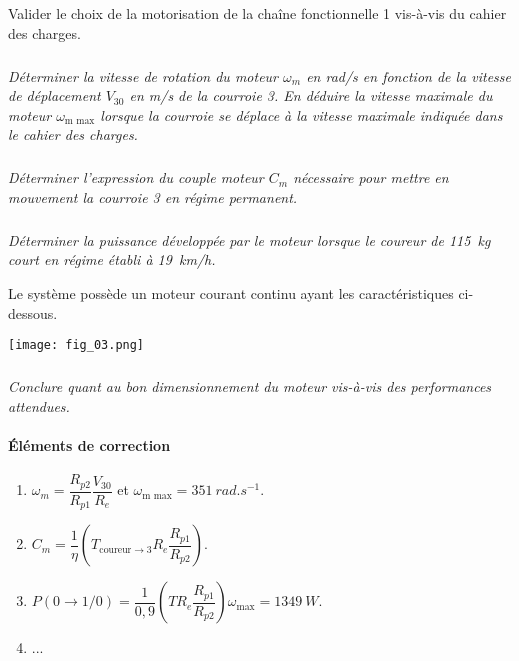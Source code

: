 \begin{multicols}{2}
\begin{obj}
Valider le choix de la motorisation de la chaîne fonctionnelle 1 vis-à-vis du cahier des charges.
\end{obj}


\subparagraph{}
\textit{Déterminer la vitesse de rotation du moteur $\omega_m$ en rad/s en fonction de la vitesse de déplacement
$V_{30}$ en m/s de la courroie 3. En déduire la vitesse maximale du moteur $\omega_{\text{m max}}$ lorsque la courroie se
déplace à la vitesse maximale indiquée dans le cahier des charges.}
\ifprof
\begin{corrige}
\end{corrige}\else\fi


\subparagraph{}
\textit{Déterminer l’expression du couple moteur $C_m$ nécessaire pour mettre en mouvement la courroie 3 en
régime permanent.}
\ifprof
\begin{corrige}
\end{corrige}\else\fi


\subparagraph{}
\textit{Déterminer la puissance développée par le moteur lorsque le coureur de \SI{115}{kg} court en régime
établi à \SI{19}{km/h}.}
\ifprof
\begin{corrige}
\end{corrige}\else\fi
Le système possède
un moteur courant
continu ayant les
caractéristiques ci-dessous.

\begin{center}
\texttt{[image: fig\_03.png]}
\end{center}

\subparagraph{}
\textit{Conclure quant au bon dimensionnement du moteur vis-à-vis des performances attendues.}
\ifprof
\begin{corrige}
\end{corrige}\else\fi

\ifcolle
\else
\vspace{1cm}
\footnotesize
\paragraph*{Éléments de correction}
\begin{enumerate}
\item $\omega_m=\dfrac{R_{p2}}{R_{p1}}\dfrac{V_{30}}{R_e}$ et $\omega_{\text{m max}}=\SI{351}{rad.s^{-1}}$.
\item $C_m=\dfrac{1}{\eta}\left( T_{\text{coureur}\rightarrow 3} R_e \dfrac{R_{p1}}{R_{p2}}\right)$.
\item $P\left(0\to1/0 \right)=\dfrac{1}{0,9}\left(T R_e \dfrac{R_{p1}}{R_{p2}} \right) \omega_{\text{max}}=\SI{1349}{W}$.
\item ...
\end{enumerate}
\fi

\ifprof
\else
\end{multicols}
\fi


